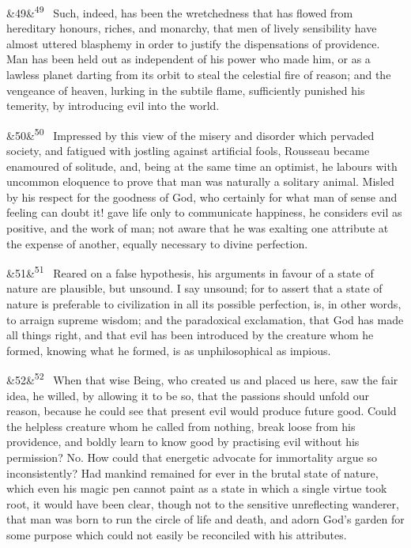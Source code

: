 \documentclass[12pt]{article}
\newcommand{\para}[1][]{\par\noindent\ifx&#1&\else\textsuperscript{\footnotesize #1}~\fi}
\begin{document}
\para[49] Such, indeed, has been the wretchedness that has flowed from hereditary honours, riches, and monarchy, that men of lively sensibility have almost uttered blasphemy in order to justify the dispensations of providence. Man has been held out as independent of his power who made him, or as a lawless planet darting from its orbit to steal the celestial fire of reason; and the vengeance of heaven, lurking in the subtile flame, sufficiently punished his temerity, by introducing evil into the world.

\para[50] Impressed by this view of the misery and disorder which pervaded society, and fatigued with jostling against artificial fools, Rousseau became enamoured of solitude, and, being at the same time an optimist, he labours with uncommon eloquence to prove that man was naturally a solitary animal. Misled by his respect for the goodness of God, who certainly for what man of sense and feeling can doubt it! gave life only to communicate happiness, he considers evil as positive, and the work of man; not aware that he was exalting one attribute at the expense of another, equally necessary to divine perfection.

\para[51] Reared on a false hypothesis, his arguments in favour of a state of nature are plausible, but unsound. I say unsound; for to assert that a state of nature is preferable to civilization in all its possible perfection, is, in other words, to arraign supreme wisdom; and the paradoxical exclamation, that God has made all things right, and that evil has been introduced by the creature whom he formed, knowing what he formed, is as unphilosophical as impious.

\para[52] When that wise Being, who created us and placed us here, saw the fair idea, he willed, by allowing it to be so, that the passions should unfold our reason, because he could see that present evil would produce future good. Could the helpless creature whom he called from nothing, break loose from his providence, and boldly learn to know good by practising evil without his permission? No. How could that energetic advocate for immortality argue so inconsistently? Had mankind remained for ever in the brutal state of nature, which even his magic pen cannot paint as a state in which a single virtue took root, it would have been clear, though not to the sensitive unreflecting wanderer, that man was born to run the circle of life and death, and adorn God's garden for some purpose which could not easily be reconciled with his attributes.
\end{document}
